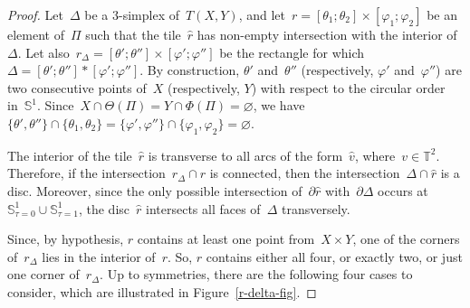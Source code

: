 \documentclass{amsart}
\theoremstyle{theorem}
\theoremstyle{remark}
\theoremstyle{definition}
\numberwithin{equation}{section}
\numberwithin{figure}{section}
\begin{document}
\begin{proof}
Let~$\Delta$ be a $3$-simplex of~$T(X,Y)$, and let~$r=[\theta_1;\theta_2]\times[\varphi_1;\varphi_2]$
be an element of~$\Pi$ such that the tile~$\widehat r$
has non-empty intersection with the interior of~$\Delta$. Let also~$r_\Delta=[\theta';\theta'']\times[\varphi';\varphi'']$
be the rectangle for which~$\Delta=[\theta';\theta'']*[\varphi';\varphi'']$. By construction, $\theta'$ and~$\theta''$
(respectively, $\varphi'$ and~$\varphi''$) are two consecutive points of~$X$ (respectively, $Y$)
with respect to the circular order in~$\mathbb S^1$. Since~$X\cap\Theta(\Pi)=Y\cap\Phi(\Pi)=\varnothing$,
we have~$\{\theta',\theta''\}\cap\{\theta_1,\theta_2\}=\{\varphi',\varphi''\}\cap\{\varphi_1,\varphi_2\}=\varnothing$.

The interior of the tile~$\widehat r$ is transverse to all arcs of the form~$\widehat v$, where~$v\in\mathbb T^2$. Therefore,
if the intersection~$r_\Delta\cap r$ is connected, then the intersection~$\Delta\cap\widehat r$ is a disc.
Moreover, since the only possible intersection of~$\partial\widehat r$ with~$\partial\Delta$
occurs at~$\mathbb S^1_{\tau=0}\cup\mathbb S^1_{\tau=1}$, the disc~$\widehat r$ intersects all faces of~$\Delta$ transversely.

Since, by hypothesis, $r$ contains at least one point from~$X\times Y$, one of the corners of~$r_\Delta$
lies in the interior of~$r$. So, $r$ contains either all four, or exactly two, or just one corner of~$r_\Delta$.
Up to symmetries, there are the following four cases to consider, which are illustrated in Figure~\ref{r-delta-fig}.


\end{proof}
\end{document}
